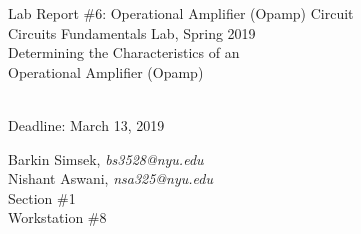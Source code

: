 \documentclass[journal]{IEEEtran}
\begin{document}
\begin{titlepage}
    {\centering
        \vspace*{20em}
        {
        \huge 
        \begin{spacing}{1.5}
            Lab Report \#6: Operational Amplifier (Opamp) Circuit
            \\
            Circuits Fundamentals Lab, Spring 2019
            \bigskip
            \Large
            \\
            Determining the Characteristics of an\\
             Operational Amplifier (Opamp)
  
            \\
            \bigskip
            Deadline: March 13, 2019 
        \end{spacing}

        }
        
    }
    \vfill
    
    {
    \large
    
    \begin{spacing}{1.5}
    \noindent Barkin Simsek, {\it {bs3528@nyu.edu}} 
    \\
    Nishant Aswani, {\it {nsa325@nyu.edu}}
    \\
    Section \#1%
    \\
    Workstation \#8%
    \end{spacing}
    }


\end{titlepage}
{}
\setcounter{page}{1}




%
{}


\begin{abstract}
In this experiment, an opamp amplifier circuit was built by using a Texas Instruments LM386 opamp. The built circuit is capable of providing a voltage gain of 200. The circuit was initially built onto a breadboard and later the circuit was soldered on to a prototyping board. Providing an extreme input voltage, providing an extreme frequency, and providing a low supply voltage each had determinetal effects on voltage output, and thus gain. It was determined that the produced circuit can be used to increase the signals in a radio receiver and is ideal for audio applications.
\end{abstract}
\end{document}
